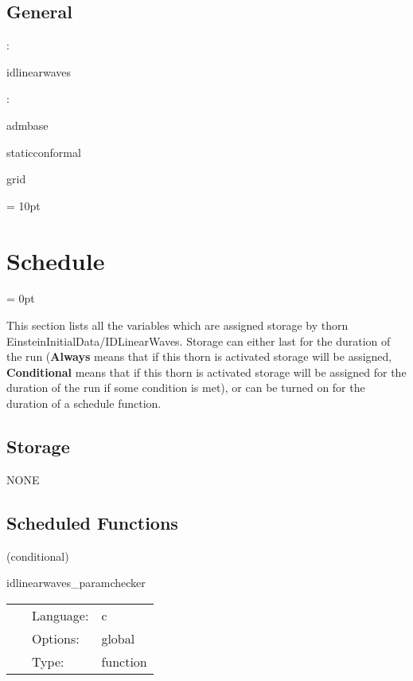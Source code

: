 \documentclass{article}
\begin{document}
\vspace{3mm} \subsection*{General}

: 

idlinearwaves
\vspace{2mm}

: 

admbase

staticconformal

grid
\vspace{2mm}

\vspace{5mm}\parskip = 10pt 

\section{Schedule} 


\parskip = 0pt


\noindent This section lists all the variables which are assigned storage by thorn EinsteinInitialData/IDLinearWaves.  Storage can either last for the duration of the run ({\bf Always} means that if this thorn is activated storage will be assigned, {\bf Conditional} means that if this thorn is activated storage will be assigned for the duration of the run if some condition is met), or can be turned on for the duration of a schedule function.


\subsection*{Storage}NONE
\subsection*{Scheduled Functions}
\vspace{5mm}

   (conditional) 

\hspace{5mm} idlinearwaves\_paramchecker 

\hspace{5mm}{\it check that the metric\_type is recognised } 


\hspace{5mm}

 \begin{tabular*}{160mm}{cll} 
~ & Language:  & c \\ 
~ & Options:  & global \\ 
~ & Type:  & function \\ 
\end{tabular*} 
\end{document}
